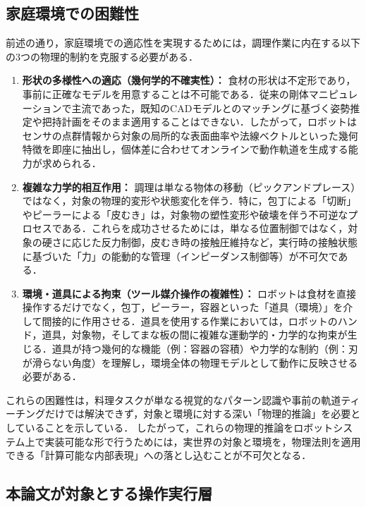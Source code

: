 \subsection{家庭環境での困難性}

前述の通り，家庭環境での適応性を実現するためには，調理作業に内在する以下の3つの物理的制約を克服する必要がある．

\begin{enumerate}
    \item \textbf{形状の多様性への適応（幾何学的不確実性）：} 食材の形状は不定形であり，事前に正確なモデルを用意することは不可能である．従来の剛体マニピュレーションで主流であった，既知のCADモデルとのマッチングに基づく姿勢推定や把持計画をそのまま適用することはできない．したがって，ロボットはセンサの点群情報から対象の局所的な表面曲率や法線ベクトルといった幾何特徴を即座に抽出し，個体差に合わせてオンラインで動作軌道を生成する能力が求められる．
    
    \item \textbf{複雑な力学的相互作用：} 調理は単なる物体の移動（ピックアンドプレース）ではなく，対象の物理的変形や状態変化を伴う．特に，包丁による「切断」やピーラーによる「皮むき」は，対象物の塑性変形や破壊を伴う不可逆なプロセスである．これらを成功させるためには，単なる位置制御ではなく，対象の硬さに応じた反力制御，皮むき時の接触圧維持など，実行時の接触状態に基づいた「力」の能動的な管理（インピーダンス制御等）が不可欠である．
    
    \item \textbf{環境・道具による拘束（ツール媒介操作の複雑性）：} ロボットは食材を直接操作するだけでなく，包丁，ピーラー，容器といった「道具（環境）」を介して間接的に作用させる．道具を使用する作業においては，ロボットのハンド，道具，対象物，そしてまな板の間に複雑な運動学的・力学的な拘束が生じる．道具が持つ幾何的な機能（例：容器の容積）や力学的な制約（例：刃が滑らない角度）を理解し，環境全体の物理モデルとして動作に反映させる必要がある．
\end{enumerate}

これらの困難性は，料理タスクが単なる視覚的なパターン認識や事前の軌道ティーチングだけでは解決できず，対象と環境に対する深い「物理的推論」を必要としていることを示している．
したがって，これらの物理的推論をロボットシステム上で実装可能な形で行うためには，実世界の対象と環境を，物理法則を適用できる「計算可能な内部表現」への落とし込むことが不可欠となる．

\subsection{本論文が対象とする操作実行層}

